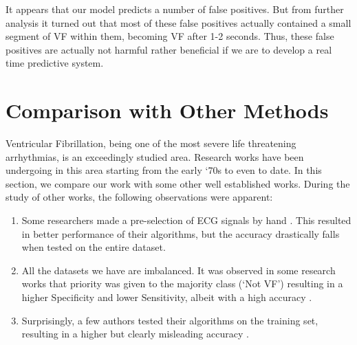 \documentclass[12pt,a4paper]{article}
\begin{document}
It appears that our model predicts a number of false positives. But from further analysis it turned out that most of these false positives actually contained a small segment of VF within them, becoming VF after 1-2 seconds. Thus, these false positives are actually not harmful rather beneficial if we are to develop a real time predictive system.


\section{Comparison with Other Methods}
\label{Comparison}

Ventricular Fibrillation, being one of the most severe life threatening arrhythmias, is an exceedingly studied area. Research works have been undergoing in this area starting from the early `70s to even to date. In this section, we compare our work with some other well established works. During the study of other works, the following observations were apparent:
\begin{enumerate}
    \item Some researchers made a pre-selection of ECG signals by hand \cite{thakor1990ventricular,chen1987ventricular,kuo1978computer,barro1989algorithmic,zhang1999detecting,li1995detection,pan1985real,arafat2009detection,anas2011exploiting}. This resulted in better performance of their algorithms, but the accuracy drastically falls when tested on the entire dataset\cite{amann2005reliability}.
    \item All the datasets we have are imbalanced. It was observed in some research works that priority was given to the majority class (`Not VF') resulting in a higher Specificity and lower Sensitivity, albeit with a high accuracy \cite{anas2011exploiting,amann2005new,amann2007detecting,alonso2012feature,song2005support,asl2008support,acharya2017automated}.
    \item Surprisingly, a few authors tested their algorithms on the training set, resulting in a higher but clearly misleading accuracy \cite{song2005support}.
\end{enumerate}
\end{document}
